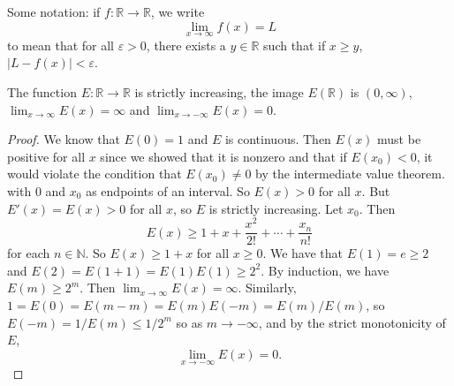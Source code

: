 \documentclass[11pt]{article}
\theoremstyle{definition}
\newcommand{\R}{\mathbb{R}}                      %
\newcommand{\N}{\mathbb{N}}
\begin{document}
Some notation: if $f:\R\to\R$, we write
$$
\lim_{x\to\infty} f(x)=L
$$
to mean that for all $\varepsilon>0$, there exists a $y\in\R$ such that if $x\geq y$, $|L-f(x)|<\varepsilon$.

\prop The function $E:\R\to\R$ is strictly increasing, the image $E(\R)$ is $(0,\infty)$, $\lim_{x\to\infty} E(x)=\infty$ and $\lim_{x\to-\infty} E(x)=0$.

\begin{proof}
    We know that $E(0)=1$ and $E$ is continuous. Then $E(x)$ must be positive for all $x$ since we showed that it is nonzero and that if $E(x_0)<0$, it would violate the condition that $E(x_0)\neq 0$ by the intermediate value theorem. with $0$ and $x_0$ as endpoints of an interval. So $E(x)>0$ for all $x$. But $E'(x)=E(x)>0$ for all $x$, so $E$ is strictly increasing. Let $x_0$. Then
    $$
    E(x)\geq 1+ x+\frac{x^2}{2!}+\cdots+\frac{x_n}{n!}
    $$
    for each $n\in \N$. So $E(x)\geq 1+x$ for all $x\geq 0$. We have that $E(1)=e\geq 2$ and $E(2)=E(1+1)=E(1)E(1)\geq 2^2$. By induction, we have $E(m)\geq 2^m$. Then $\lim_{x\to\infty} E(x)=\infty$. Similarly, $1=E(0)=E(m-m)=E(m)E(-m)=E(m)/E(m)$, so $E(-m)=1/E(m)\leq 1/2^m$ so as $m\to-\infty$, and by the strict monotonicity of $E$,
    $$
    \lim_{x\to-\infty} E(x)=0.
    $$
\end{proof}
\end{document}
